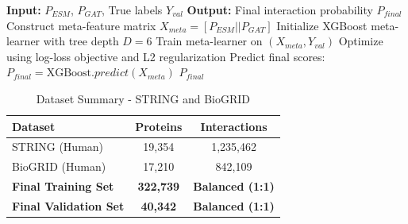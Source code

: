 \documentclass[12pt,a4paper]{report}
\begin{document}
\begin{algorithm}[H]
\caption{XGBoost Stacking Ensemble}
\begin{algorithmic}[1]
\STATE \textbf{Input:} $P_{ESM}$, $P_{GAT}$, True labels $Y_{val}$
\STATE \textbf{Output:} Final interaction probability $P_{final}$
\STATE Construct meta-feature matrix $X_{meta} = [P_{ESM} || P_{GAT}]$
\STATE Initialize XGBoost meta-learner with tree depth $D=6$
\STATE Train meta-learner on $(X_{meta}, Y_{val})$
\STATE Optimize using log-loss objective and L2 regularization
\STATE Predict final scores: $P_{final} = \text{XGBoost}.predict(X_{meta})$
\RETURN $P_{final}$
\end{algorithmic}
\end{algorithm}


\begin{table}[H]
\centering
\caption{Dataset Summary - STRING and BioGRID}
\begin{tabular}{|l|c|c|}
\hline
\textbf{Dataset} & \textbf{Proteins} & \textbf{Interactions} \\ \hline
STRING (Human) & 19,354 & 1,235,462 \\ \hline
BioGRID (Human) & 17,210 & 842,109 \\ \hline
\textbf{Final Training Set} & \textbf{322,739} & \textbf{Balanced (1:1)} \\ \hline
\textbf{Final Validation Set} & \textbf{40,342} & \textbf{Balanced (1:1)} \\ \hline
\end{tabular}
\label{tab:dataset}
\end{table}
\end{document}
